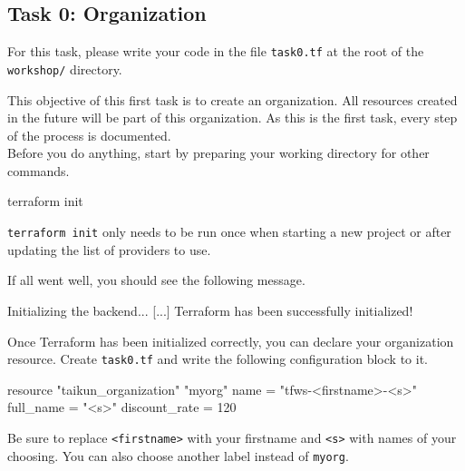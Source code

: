 \subsection{Task 0: Organization}\label{sec:task0}

\begin{note}
For this task, please write your code in the file \texttt{task0.tf}
at the root of the \texttt{workshop/} directory.
\end{note}

This objective of this first task is to create an organization.
All resources created in the future will be part of this organization.
As this is the first task, every step of the process is documented.\\

Before you do anything, start by preparing your working directory for other commands.
\begin{shell}
terraform init
\end{shell}
\begin{tip}
\texttt{terraform init} only needs to be run once when starting a new project or after updating
the list of providers to use.
\end{tip}
If all went well, you should see the following message.
\begin{raw}
Initializing the backend...
[...]
Terraform has been successfully initialized!
\end{raw}

Once Terraform has been initialized correctly, you can declare your organization resource.
Create \texttt{task0.tf} and write the following configuration block to it.
\begin{tf}
resource "taikun_organization" "myorg" {
  name          = "tfws-<firstname>-<s>"
  full_name     = "<s>"
  discount_rate = 120
}
\end{tf}
Be sure to replace \texttt{<firstname>} with your firstname and \texttt{<s>} with
names of your choosing. You can also choose another label instead of \texttt{myorg}.

